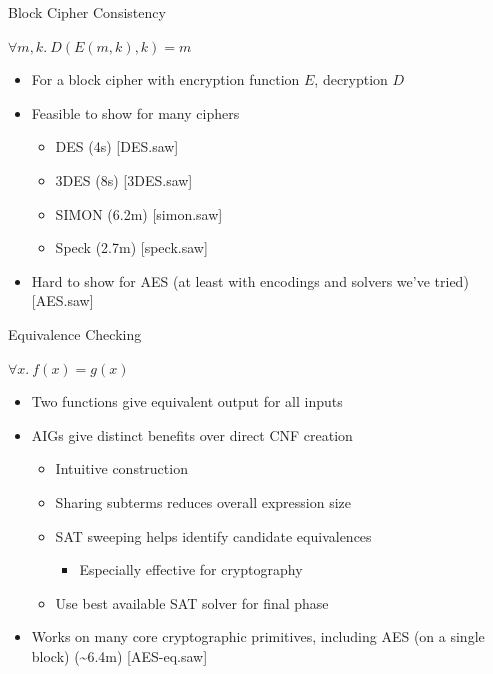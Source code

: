 \documentclass[ignorenonframetext,]{beamer}
\providecommand{\tightlist}{%
  \setlength{\itemsep}{0pt}\setlength{\parskip}{0pt}}
\newcommand{\infile}[1]{{\tiny \alert{[#1]}}}
\begin{document}
\begin{frame}{Block Cipher Consistency}

\begin{center}
$\forall m, k.~D(E(m, k), k) = m$
\end{center}

\begin{itemize}
\tightlist
\item
  For a block cipher with encryption function \(E\), decryption \(D\)
\item
  Feasible to show for many ciphers

  \begin{itemize}
  \tightlist
  \item
    DES (4s) \infile{DES.saw}
  \item
    3DES (8s) \infile {3DES.saw}
  \item
    SIMON (6.2m) \infile{simon.saw}
  \item
    Speck (2.7m) \infile{speck.saw}
  \end{itemize}
\item
  Hard to show for AES (at least with encodings and solvers we've tried)
  \infile{AES.saw}
\end{itemize}

\end{frame}

\begin{frame}{Equivalence Checking}

\begin{center}
$\forall x.~f(x) = g(x)$
\end{center}

\begin{itemize}
\tightlist
\item
  Two functions give equivalent output for all inputs
\item
  AIGs give distinct benefits over direct CNF creation

  \begin{itemize}
  \tightlist
  \item
    Intuitive construction
  \item
    Sharing subterms reduces overall expression size
  \item
    SAT sweeping helps identify candidate equivalences

    \begin{itemize}
    \tightlist
    \item
      Especially effective for cryptography
    \end{itemize}
  \item
    Use best available SAT solver for final phase
  \end{itemize}
\item Works on many core cryptographic primitives, including AES (on a single
  block) (\textasciitilde{}6.4m) \infile{AES-eq.saw}
\end{itemize}

\end{frame}
\end{document}

